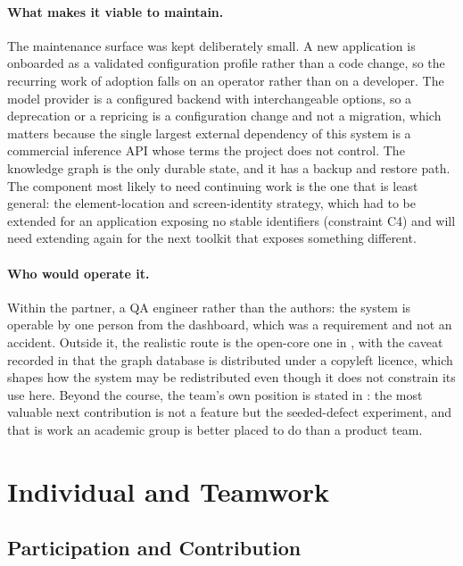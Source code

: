 \paragraph{What makes it viable to maintain.} The maintenance surface was kept
deliberately small. A new application is onboarded as a validated configuration
profile rather than a code change, so the recurring work of adoption falls on
an operator rather than on a developer. The model provider is a configured
backend with interchangeable options, so a deprecation or a repricing is a
configuration change and not a migration, which matters because the single
largest external dependency of this system is a commercial inference API whose
terms the project does not control. The knowledge graph is the only durable
state, and it has a backup and restore path. The component most likely to need
continuing work is the one that is least general: the element-location and
screen-identity strategy, which had to be extended for an application exposing
no stable identifiers (constraint C4) and will need extending again for the
next toolkit that exposes something different.

\paragraph{Who would operate it.} Within the partner, a QA engineer rather than
the authors: the system is operable by one person from the dashboard, which was
a requirement and not an accident. Outside it, the realistic route is the
open-core one in , with the caveat recorded in
 that the graph database is distributed under a copyleft licence,
which shapes how the system may be redistributed even though it does not
constrain its use here. Beyond the course, the team's own position is stated in
: the most valuable next contribution is not a feature but
the seeded-defect experiment, and that is work an academic group is better
placed to do than a product team.

\section{Individual and Teamwork}
\label{sec:team}

\subsection{Participation and Contribution}
\label{sec:participation}

